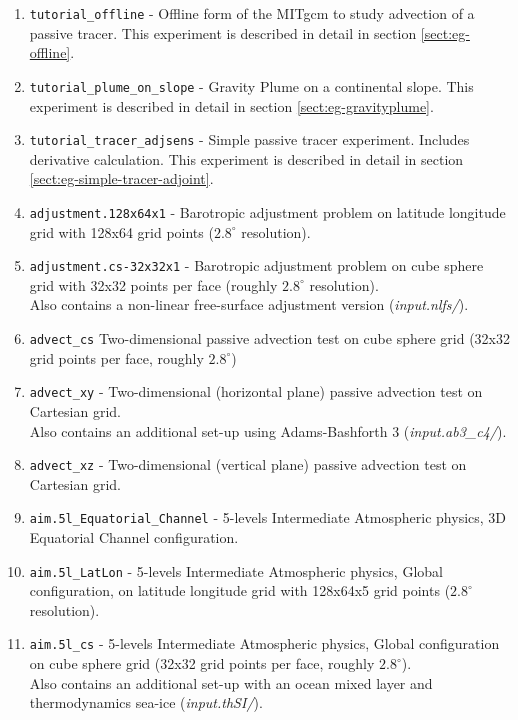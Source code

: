 \begin{enumerate}
\item \texttt{tutorial\_offline} - Offline form of the MITgcm to study
  advection of a passive tracer.  This experiment is described in
  detail in section \ref{sect:eg-offline}.

\item \texttt{tutorial\_plume\_on\_slope} - Gravity Plume on a
  continental slope.  This experiment is described in detail in
  section \ref{sect:eg-gravityplume}.

\item \texttt{tutorial\_tracer\_adjsens} - Simple passive tracer
  experiment. Includes derivative calculation. This experiment is
  described in detail in section \ref{sect:eg-simple-tracer-adjoint}.

\item \texttt{adjustment.128x64x1} - Barotropic adjustment problem on
  latitude longitude grid with 128x64 grid points ($2.8^\circ$ resolution).
  
\item \texttt{adjustment.cs-32x32x1} - Barotropic adjustment problem on
  cube sphere grid with 32x32 points per face (roughly $2.8^\circ$
  resolution).\\
  Also contains a non-linear free-surface adjustment version ({\it input.nlfs/}).
  
\item \texttt{advect\_cs} Two-dimensional passive advection test on
  cube sphere grid (32x32 grid points per face, roughly $2.8^\circ$)
  
\item \texttt{advect\_xy} - Two-dimensional (horizontal plane) passive
  advection test on Cartesian grid.\\
  Also contains an additional set-up using Adams-Bashforth 3 ({\it input.ab3\_c4/}).
  
\item \texttt{advect\_xz} - Two-dimensional (vertical plane) passive
  advection test on Cartesian grid.
  
\item \texttt{aim.5l\_Equatorial\_Channel}
  - 5-levels Intermediate Atmospheric physics, 
  3D Equatorial Channel configuration.
  
\item \texttt{aim.5l\_LatLon} - 5-levels Intermediate Atmospheric physics,
  Global configuration, on latitude longitude grid with 128x64x5 grid
  points ($2.8^\circ$ resolution).
  
\item \texttt{aim.5l\_cs} - 5-levels Intermediate Atmospheric physics,
  Global configuration on cube sphere grid 
  (32x32 grid points per face, roughly $2.8^\circ$).\\
  Also contains an additional set-up with an ocean mixed layer and thermodynamics
  sea-ice ({\it input.thSI/}).


\end{enumerate}
